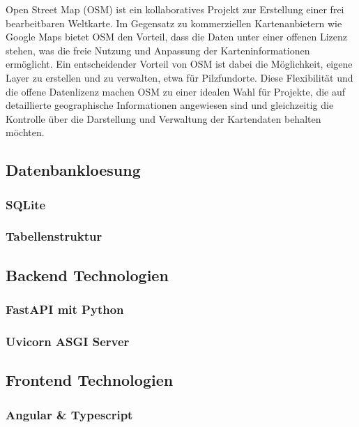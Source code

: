 \documentclass[../main.tex]{subfiles} %
\begin{document}
Open Street Map (OSM) ist ein kollaboratives Projekt zur Erstellung einer frei bearbeitbaren Weltkarte. Im Gegensatz zu kommerziellen
Kartenanbietern wie Google Maps bietet OSM den Vorteil, dass die Daten unter einer offenen Lizenz stehen, was die freie Nutzung und
Anpassung der Karteninformationen ermöglicht. Ein entscheidender Vorteil von OSM ist dabei die Möglichkeit, eigene Layer zu erstellen und 
zu verwalten, etwa für Pilzfundorte. Diese Flexibilität und die offene Datenlizenz machen OSM zu einer idealen Wahl für Projekte, die auf 
detaillierte geographische Informationen angewiesen sind und gleichzeitig die Kontrolle über die Darstellung und Verwaltung der Kartendaten 
behalten möchten.

\subsection{Datenbankloesung} %

\subsubsection{SQLite}

\subsubsection{Tabellenstruktur}

\subsection{Backend Technologien} %

\subsubsection{FastAPI mit Python}

\subsubsection{Uvicorn ASGI Server}

\subsection{Frontend Technologien} %

\subsubsection{Angular & Typescript}
\end{document}
